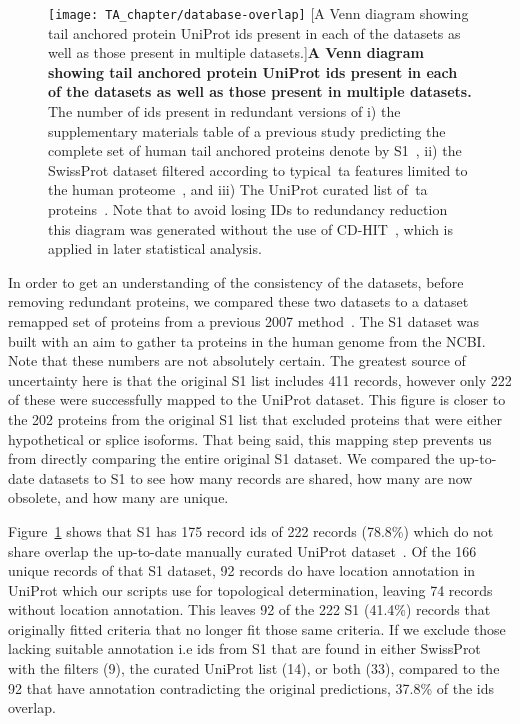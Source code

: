 \begin{figure}[!ht]
\centering
\texttt{[image: TA\_chapter/database-overlap]}
		[A Venn diagram showing tail anchored protein UniProt ids present in each of the datasets as well as those present in multiple datasets.]{\textbf{A Venn diagram showing tail anchored protein UniProt ids present in each of the datasets as well as those present in multiple datasets.}
The number of ids present in redundant versions of
i) the supplementary materials table of a previous study predicting the complete set of human tail anchored proteins denote by S1~\cite{Kalbfleisch2007},
ii) the SwissProt dataset filtered according to typical~\gls{ta} features limited to the human proteome~\cite{TheUniProtConsortium2014}, and
iii) The UniProt curated list of~\gls{ta} proteins~\cite{TheUniProtConsortium2014}.
Note that to avoid losing IDs to redundancy reduction this diagram was generated without the use of CD-HIT~\cite{Huang2010, Wu2011}, which is applied in later statistical analysis.}

\label{fig:tadatasetoverlap}
\end{figure}

In order to get an understanding of the consistency of the datasets, before removing redundant proteins, we compared these two datasets to a dataset remapped set of proteins from a previous 2007 method~\cite{Kalbfleisch2007}.
The S1 dataset was built with an aim to gather \gls{ta} proteins in the human genome from the NCBI.
Note that these numbers are not absolutely certain.
The greatest source of uncertainty here is that the original S1 list includes 411 records, however only 222 of these were successfully mapped to the UniProt dataset.
This figure is closer to the 202 proteins from the original S1 list that excluded proteins that were either hypothetical or splice isoforms.
That being said, this mapping step prevents us from directly comparing the entire original S1 dataset.
We compared the up-to-date datasets to S1 to see how many records are shared, how many are now obsolete, and how many are unique.

Figure~\ref{fig:tadatasetoverlap} shows that S1 has 175 record ids of 222 records (78.8\%) which do not share overlap the up-to-date manually curated UniProt dataset~\cite{TheUniProtConsortium2014}.
Of the 166 unique records of that S1 dataset, 92 records do have location annotation in UniProt which our scripts use for topological determination, leaving 74 records without location annotation.
This leaves 92 of the 222 S1 (41.4\%) records that originally fitted criteria that no longer fit those same criteria.
If we exclude those lacking suitable annotation i.e ids from S1 that are found in either SwissProt with the filters (9), the curated UniProt list (14), or both (33), compared to the 92 that have annotation contradicting the original predictions, 37.8\% of the ids overlap.

